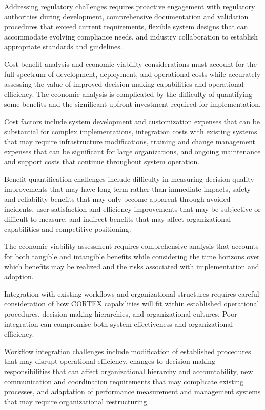 Addressing regulatory challenges requires proactive engagement with regulatory authorities during development, comprehensive documentation and validation procedures that exceed current requirements, flexible system designs that can accommodate evolving compliance needs, and industry collaboration to establish appropriate standards and guidelines.

Cost-benefit analysis and economic viability considerations must account for the full spectrum of development, deployment, and operational costs while accurately assessing the value of improved decision-making capabilities and operational efficiency. The economic analysis is complicated by the difficulty of quantifying some benefits and the significant upfront investment required for implementation.

Cost factors include system development and customization expenses that can be substantial for complex implementations, integration costs with existing systems that may require infrastructure modifications, training and change management expenses that can be significant for large organizations, and ongoing maintenance and support costs that continue throughout system operation.

Benefit quantification challenges include difficulty in measuring decision quality improvements that may have long-term rather than immediate impacts, safety and reliability benefits that may only become apparent through avoided incidents, user satisfaction and efficiency improvements that may be subjective or difficult to measure, and indirect benefits that may affect organizational capabilities and competitive positioning.

The economic viability assessment requires comprehensive analysis that accounts for both tangible and intangible benefits while considering the time horizons over which benefits may be realized and the risks associated with implementation and adoption.

Integration with existing workflows and organizational structures requires careful consideration of how CORTEX capabilities will fit within established operational procedures, decision-making hierarchies, and organizational cultures. Poor integration can compromise both system effectiveness and organizational efficiency.

Workflow integration challenges include modification of established procedures that may disrupt operational efficiency, changes to decision-making responsibilities that can affect organizational hierarchy and accountability, new communication and coordination requirements that may complicate existing processes, and adaptation of performance measurement and management systems that may require organizational restructuring.

